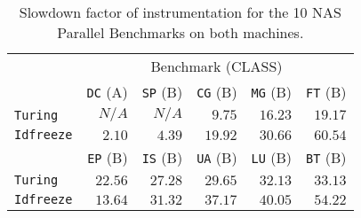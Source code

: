 
\begin{table}
    \centering
    \begin{tabular}{lrrrrr}
        \toprule
         & \multicolumn{5}{c}{Benchmark (CLASS)} \\
        \cmidrule(lr){2-6}
            &\texttt{DC} (A) &\texttt{SP} (B)&\texttt{CG} (B)&\texttt{MG} (B)&\texttt{FT} (B) \\ 
        \cmidrule(lr){2-6}
        \texttt{Turing} &$N/A$ &$N/A$ &$9.75 $ &$16.23$ &$19.17$ \\
        \texttt{Idfreeze} &$2.10$  & $4.39$  &  $19.92$ &   $30.66$ &    $60.54$ \\
        \midrule
        \midrule
                &\texttt{EP} (B)&\texttt{IS} (B)&\texttt{UA} (B)&\texttt{LU} (B)&\texttt{BT} (B)\\
        \cmidrule(lr){2-6}
        \texttt{Turing} &$22.56$ &$27.28$ &$29.65$ &$32.13$ &$33.13$ \\
        \texttt{Idfreeze} & $13.64$ &$31.32$ & $37.17$ &  $40.05$ &   $54.22$ \\
        \bottomrule
    \end{tabular}
    \caption{Slowdown factor of \TABARNAC instrumentation for the 10 NAS Parallel
        Benchmarks on both machines.}
    \label{tab:ovh}
\end{table}

